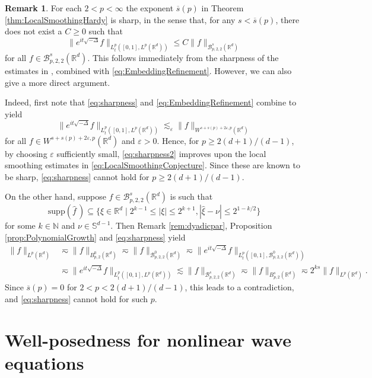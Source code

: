 \documentclass{amsart}
\theoremstyle{definition}
\newtheorem{remark}[theorem]{Remark}
\newcommand{\R}{\mathbb{R}}
\newcommand{\N}{\mathbb{N}}
\newcommand {\Rd}{\mathbb{R}^{d}}
\newcommand{\Su}{\mathbb{S}}
\newcommand {\Ba}{\mathcal{B}}
\newcommand {\supp}{\mathrm{supp}}
\newcommand{\wh}{\widehat}
\newcommand {\veps}{\varepsilon}
\numberwithin{equation}{section}
\begin{document}
\begin{remark}\label{rem:sharpness2}
For each $2<p<\infty$ the exponent $\overline{s}(p)$ in Theorem \ref{thm:LocalSmoothingHardy} is sharp, in the sense that, for any $s<\overline{s}(p)$, there does not exist a $C\geq0$ such that
\begin{equation}\label{eq:sharpness}
\| e^{it \sqrt{- \Delta}} f \|_{L_t^p([0,1],L^p(\R^d))}\leq C\|f\|_{\Ba^{s}_{p,2,2}(\Rd)}
\end{equation}
for all $f\in\Ba^{s}_{p,2,2}(\Rd)$. This follows immediately from the sharpness of the estimates in \cite{Rozendaal2021LocalSmoothing}, combined with \eqref{eq:EmbeddingRefinement}. However, we can also give a more direct argument.

Indeed, first note that \eqref{eq:sharpness} and \eqref{eq:EmbeddingRefinement} combine to yield
\begin{equation}\label{eq:sharpness2}
\| e^{it \sqrt{- \Delta}} f \|_{L_t^p([0,1],L^p(\R^d))}\lesssim_{\veps}\|f\|_{W^{s+s(p)+2\veps,p}(\Rd)}
\end{equation}
for all $f\in W^{s+s(p)+2\veps,p}(\Rd)$ and $\veps>0$. Hence, for $p\geq 2(d+1)/(d-1)$, by choosing $\veps$ sufficiently small, \eqref{eq:sharpness2} improves upon the local smoothing estimates in \eqref{eq:LocalSmoothingConjecture}. Since these are known to be sharp, \eqref{eq:sharpness} cannot hold for $p\geq 2(d+1)/(d-1)$.

On the other hand, suppose $f\in \Ba^{s}_{p,2,2}(\Rd)$ is such that 
\[
\supp(\wh{f}\,)\subseteq\{\xi\in\Rd\mid 2^{k-1}\leq |\xi|\leq 2^{k+1}, |\hat{\xi}-\nu|\leq 2^{1-k/2}\}
\]
for some $k\in\N$ and $\nu\in\Su^{d-1}$. Then Remark \ref{rem:dyadicpar}, Proposition \ref{prop:PolynomialGrowth} and \eqref{eq:sharpness} yield
\begin{align*}
\|f\|_{L^{p}(\Rd)}&\eqsim \|f\|_{B^{0}_{p,2}(\Rd)}\eqsim \|f\|_{\Ba^{0}_{p,2,2}(\Rd)}\eqsim \| e^{it \sqrt{- \Delta}} f \|_{L_t^p([0,1],\Ba^{0}_{p,2,2}(\R^d))}\\
&\eqsim \| e^{it \sqrt{- \Delta}} f \|_{L_t^p([0,1],L^p(\R^d))}\lesssim \|f\|_{\Ba^{s}_{p,2,2}(\Rd)}\eqsim \|f\|_{B^{s}_{p,2}(\Rd)}\eqsim 2^{ks}\|f\|_{L^{p}(\Rd)}.
\end{align*}
Since $\overline{s}(p)=0$ for $2<p<2(d+1)/(d-1)$, this leads to a contradiction, and \eqref{eq:sharpness} cannot hold for such $p$.
\end{remark}




\section{Well-posedness for nonlinear wave equations}
\label{section:LWPNLW}
\end{document}
